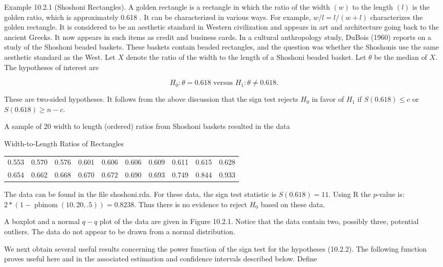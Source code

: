 Example 10.2.1 (Shoshoni Rectangles). A golden rectangle is a rectangle in which the ratio of the width $(w)$ to the length $(l)$ is the golden ratio, which is approximately 0.618 . It can be characterized in various ways. For example, $w / l=l /(w+l)$ characterizes the golden rectangle. It is considered to be an aesthetic standard in Western civilization and appears in art and architecture going back to the ancient Greeks. It now appears in such items as credit and business cards. In a cultural anthropology study, DuBois (1960) reports on a study of the Shoshoni beaded baskets. These baskets contain beaded rectangles, and the question was whether the Shoshonis use the same aesthetic standard as the West. Let $X$ denote the ratio of the width to the length of a Shoshoni beaded basket. Let $\theta$ be the median of $X$. The hypotheses of interest are

$$
H_{0}: \theta=0.618 \text { versus } H_{1}: \theta \neq 0.618 .
$$

These are two-sided hypotheses. It follows from the above discussion that the sign test rejects $H_{0}$ in favor of $H_{1}$ if $S(0.618) \leq c$ or $S(0.618) \geq n-c$.

A sample of 20 width to length (ordered) ratios from Shoshoni baskets resulted in the data

Width-to-Length Ratios of Rectangles

\begin{center}
\begin{tabular}{|llllllllll|}
\hline
0.553 & 0.570 & 0.576 & 0.601 & 0.606 & 0.606 & 0.609 & 0.611 & 0.615 & 0.628 \\
0.654 & 0.662 & 0.668 & 0.670 & 0.672 & 0.690 & 0.693 & 0.749 & 0.844 & 0.933 \\
\hline
\end{tabular}
\end{center}

The data can be found in the file shoshoni.rda. For these data, the sign test statistic is $S(0.618)=11$. Using R the $p$-value is: $2 *(1-\operatorname{pbinom}(10,20, .5))=0.8238$. Thus there is no evidence to reject $H_{0}$ based on these data.

A boxplot and a normal $q-q$ plot of the data are given in Figure 10.2.1. Notice that the data contain two, possibly three, potential outliers. The data do not appear to be drawn from a normal distribution.

We next obtain several useful results concerning the power function of the sign test for the hypotheses (10.2.2). The following function proves useful here and in the associated estimation and confidence intervals described below. Define


